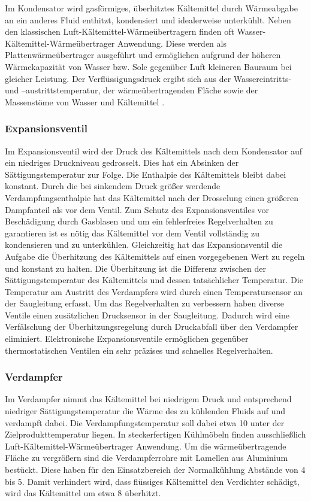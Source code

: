 Im Kondensator wird gasförmiges, überhitztes Kältemittel durch Wärmeabgabe an ein anderes Fluid enthitzt, kondensiert und idealerweise unterkühlt. Neben den klassischen Luft-Kältemittel-Wärmeübertragern finden oft Wasser-Kältemittel-Wärmeübertrager Anwendung. Diese werden als Plattenwärmeübertrager ausgeführt und ermöglichen aufgrund der höheren Wärmekapazität von Wasser bzw. Sole gegenüber Luft kleineren Bauraum bei gleicher Leistung. Der Verflüssigungsdruck ergibt sich aus der Wassereintritts- und –austrittstemperatur, der wärmeübertragenden Fläche sowie der Massenstöme von Wasser und Kältemittel \cite{Kulterer.2007}.

\subsubsection{Expansionsventil}
\label{subsubsec:Expansionsventil}


Im Expansionsventil wird der Druck des Kältemittels nach dem Kondensator auf ein niedriges Druckniveau gedrosselt. Dies hat ein Absinken der Sättigungstemperatur zur Folge. Die Enthalpie des Kältemittels bleibt dabei konstant. Durch die bei sinkendem Druck größer werdende Verdampfungsenthalpie hat das Kältemittel nach der Drosselung einen größeren Dampfanteil als vor dem Ventil. Zum Schutz des Expansionsventiles vor Beschädigung durch Gasblasen und um ein fehlerfreies Regelverhalten zu garantieren ist es nötig das Kältemittel vor dem Ventil vollständig zu kondensieren und zu unterkühlen. Gleichzeitig hat das Expansionsventil die Aufgabe die Überhitzung des Kältemittels auf einen vorgegebenen Wert zu regeln und konstant zu halten. Die Überhitzung ist die Differenz zwischen der Sättigungstemperatur des Kältemittels und dessen tatsächlicher Temperatur. Die Temperatur am Austritt des Verdampfers wird durch einen Temperatursensor an der Saugleitung erfasst. Um das Regelverhalten zu verbessern haben diverse Ventile einen zusätzlichen Drucksensor in der Saugleitung. Dadurch wird eine Verfälschung der Überhitzungsregelung durch Druckabfall über den Verdampfer eliminiert. Elektronische Expansionsventile ermöglichen gegenüber thermostatischen Ventilen ein sehr präzises und schnelles Regelverhalten. 

\subsubsection{Verdampfer}
\label{subsubsec:Verdampfer}

Im Verdampfer nimmt das Kältemittel bei niedrigem Druck und entsprechend niedriger Sättigungstemperatur die Wärme des zu kühlenden Fluids auf und verdampft dabei. Die Verdampfungstemperatur soll dabei etwa \unit{10}{\kelvin} unter der Zielprodukttemperatur liegen. In steckerfertigen Kühlmöbeln finden ausschließlich Luft-Kältemittel-Wärmeübertrager Anwendung. Um die wärmeübertragende Fläche zu vergrößern sind die Verdampferrohre mit Lamellen aus Aluminium bestückt. Diese haben für den Einsatzbereich der Normalkühlung Abstände von \unit{4}{\milli\metre} bis \unit{5}{\milli\metre}. Damit verhindert wird, dass flüssiges Kältemittel den Verdichter schädigt, wird das Kältemittel um etwa \unit{8}{\kelvin} überhitzt.



